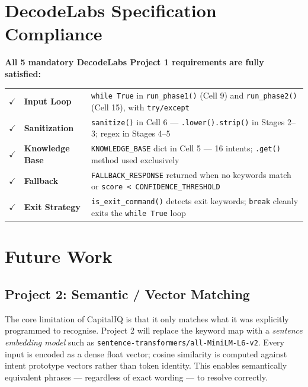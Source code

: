 \documentclass[12pt, a4paper]{article}
\begin{document}
\section{DecodeLabs Specification Compliance}

\begin{specbox}
\textbf{All 5 mandatory DecodeLabs Project 1 requirements are fully satisfied:}

\medskip
\begin{tabularx}{\linewidth}{c l X}
$\checkmark$ & \textbf{Input Loop} &
  \texttt{while True} in \texttt{run\_phase1()} (Cell 9) and
  \texttt{run\_phase2()} (Cell 15), with \texttt{try/except} \\[4pt]
$\checkmark$ & \textbf{Sanitization} &
  \texttt{sanitize()} in Cell 6 --- \texttt{.lower().strip()}
  in Stages 2--3; regex in Stages 4--5 \\[4pt]
$\checkmark$ & \textbf{Knowledge Base} &
  \texttt{KNOWLEDGE\_BASE} dict in Cell 5 --- 16 intents;
  \texttt{.get()} method used exclusively \\[4pt]
$\checkmark$ & \textbf{Fallback} &
  \texttt{FALLBACK\_RESPONSE} returned when no keywords match
  or \texttt{score < CONFIDENCE\_THRESHOLD} \\[4pt]
$\checkmark$ & \textbf{Exit Strategy} &
  \texttt{is\_exit\_command()} detects exit keywords;
  \texttt{break} cleanly exits the \texttt{while True} loop \\
\end{tabularx}
\end{specbox}

\section{Future Work}

\subsection{Project 2: Semantic / Vector Matching}

The core limitation of CapitalIQ is that it only matches what it was explicitly
programmed to recognise. Project 2 will replace the keyword map with a
\textit{sentence embedding model} such as
\texttt{sentence-transformers/all-MiniLM-L6-v2}. Every input is encoded as a
dense float vector; cosine similarity is computed against intent prototype
vectors rather than token identity. This enables semantically equivalent
phrases --- regardless of exact wording --- to resolve correctly.
\end{document}
